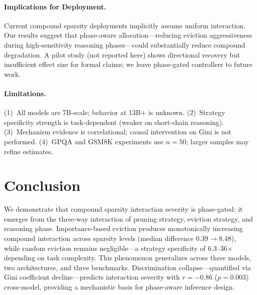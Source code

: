 \documentclass[11pt]{article}
\begin{document}
\paragraph{Implications for Deployment.}
Current compound sparsity deployments implicitly assume uniform interaction. Our results suggest that phase-aware allocation---reducing eviction aggressiveness during high-sensitivity reasoning phases---could substantially reduce compound degradation. A pilot study (not reported here) shows directional recovery but insufficient effect size for formal claims; we leave phase-gated controllers to future work.

\paragraph{Limitations.}
(1)~All models are 7B-scale; behavior at 13B+ is unknown.
(2)~Strategy specificity strength is task-dependent (weaker on short-chain reasoning).
(3)~Mechanism evidence is correlational; causal intervention on Gini is not performed.
(4)~GPQA and GSM8K experiments use $n=50$; larger samples may refine estimates.

\section{Conclusion}

We demonstrate that compound sparsity interaction severity is phase-gated: it emerges from the three-way interaction of pruning strategy, eviction strategy, and reasoning phase. Importance-based eviction produces monotonically increasing compound interaction across sparsity levels (median difference 0.39$\to$8.48), while random eviction remains negligible---a strategy specificity of 6.3--36$\times$ depending on task complexity. This phenomenon generalizes across three models, two architectures, and three benchmarks. Discrimination collapse---quantified via Gini coefficient decline---predicts interaction severity with $r=-0.86$ ($p=0.003$) cross-model, providing a mechanistic basis for phase-aware inference design.
\end{document}
